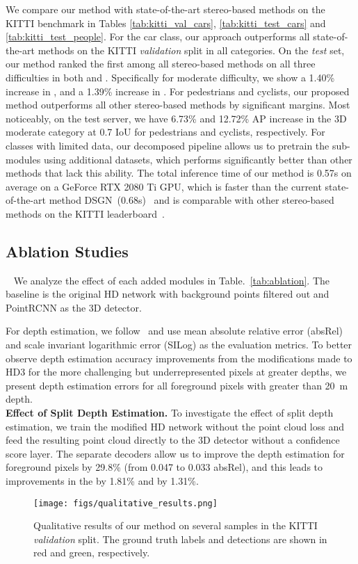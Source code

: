 \documentclass[letterpaper, 10 pt, conference]{ieeeconf}
\begin{document}
We compare our method with state-of-the-art stereo-based methods on the KITTI benchmark in Tables \ref{tab:kitti_val_cars}, \ref{tab:kitti_test_cars} and \ref{tab:kitti_test_people}. For the car class, our approach outperforms all state-of-the-art methods on the KITTI \emph{validation} split in all categories. On the \emph{test} set, our method ranked the first among all stereo-based methods on all three difficulties in both  and . Specifically for moderate difficulty, we show a 1.40\% increase in , and a 1.39\% increase in . For pedestrians and cyclists, our proposed method outperforms all other stereo-based methods by significant margins. Most noticeably, on the test server, we have 6.73\% and 12.72\% AP increase in the 3D moderate category at 0.7 IoU for pedestrians and cyclists, respectively. For classes with limited data, our decomposed pipeline allows us to pretrain the sub-modules using additional datasets, which performs significantly better than other methods that lack this ability. The total inference time of our method is 0.57s on average on a GeForce RTX 2080 Ti GPU, which is faster than the current state-of-the-art method DSGN~(0.68s)~\cite{chen2020dsgn} and is comparable with other stereo-based methods on the KITTI leaderboard~\cite{geiger2012we}.

\subsection{Ablation Studies}~\label{ablation}
We analyze the effect of each added modules in Table.~\ref{tab:ablation}. The baseline is the original HD network with background points filtered out and PointRCNN as the 3D detector. 

For depth estimation, we follow~\cite{wang2019task} and use mean absolute relative error (absRel) and scale invariant logarithmic error (SILog) as the evaluation metrics. To better observe depth estimation accuracy improvements from the modifications made to HD3 for the more challenging but underrepresented pixels at greater depths, we present depth estimation errors for all foreground pixels with greater than 20~m depth.\\

\noindent \textbf{Effect of Split Depth Estimation.} To investigate the effect of split depth estimation, we train the modified HD network without the point cloud loss and feed the resulting point cloud directly to the 3D detector without a confidence score layer. The separate decoders allow us to improve the depth estimation for foreground pixels by 29.8\% (from 0.047 to 0.033 absRel), and this leads to improvements in the  by 1.81\% and  by 1.31\%. \\
\begin{figure*} 
	\begin{center}
		\texttt{[image: figs/qualitative\_results.png]}
	\end{center}
		\caption{Qualitative results of our method on several samples in the KITTI \emph{validation} split. The ground truth labels and detections are shown in red and green, respectively. }
		\label{fig:visualization}
\end{figure*}
\end{document}

